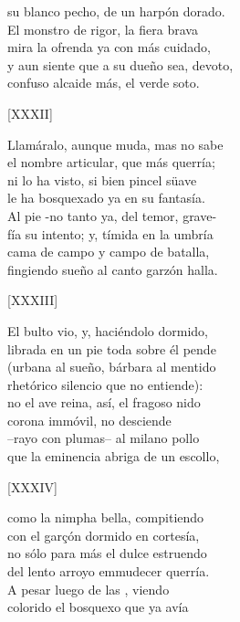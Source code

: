 \documentclass[11pt,a4paper,twoside]{article}
\begin{document}
su blanco pecho, de un harpón dorado.\\
El monstro de rigor, la fiera brava\\
mira la ofrenda ya con más cuidado,\\
y aun siente que a su dueño sea, devoto,\\
confuso alcaide más, el verde soto.\par\pend
%
\begin{center}
	[XXXII]
\end{center}\pstart
Llamáralo, aunque muda, mas no sabe\\
el nombre articular, que más querría;\\
ni lo ha visto, si bien pincel süave\\
le ha bosquexado ya en su fantasía.\\
Al pie -no tanto ya, del temor, grave-\\
fía su intento; y, tímida en la umbría\\
cama de campo y campo de batalla,\\
fingiendo sueño al canto garzón halla.\par\pend
%
\begin{center}
	[XXXIII]
\end{center}\pstart
El bulto vio, y, haciéndolo dormido,\\
librada en un pie toda sobre él pende\\
(urbana al sueño, bárbara al mentido\\
rhetórico silencio que no entiende):\\
no el ave reina, así, el fragoso nido\\
corona immóvil,  no desciende\\
--rayo con plumas-- al milano pollo\\
que la eminencia abriga de un escollo,\par\pend
%
\begin{center}
	[XXXIV]
\end{center}\pstart
como la nimpha bella, compitiendo\\
con el garçón dormido en cortesía,\\
no sólo para más el dulce estruendo\\
del lento arroyo emmudecer querría.\\
A pesar luego de las , viendo\\ colorido el bosquexo que ya avía\\
\end{document}
